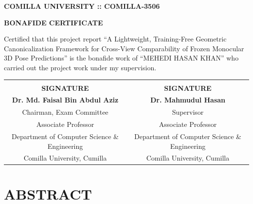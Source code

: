 \documentclass[12pt,a4paper]{report}
\begin{document}
\newpage
\thispagestyle{empty}
\begin{center}
{\fontsize{18}{22}\bfseries
COMILLA UNIVERSITY :: COMILLA-3506
}
\vspace{1cm}

{\fontsize{16}{19}\bfseries
BONAFIDE CERTIFICATE
}
\end{center}
\vspace{2cm}

\doublespacing
{\fontsize{14}{17}\selectfont
Certified that this project report ``A Lightweight, Training-Free Geometric Canonicalization Framework for Cross-View Comparability of Frozen Monocular 3D Pose Predictions'' is the bonafide work of ``MEHEDI HASAN KHAN'' who carried out the project work under my supervision.
}
\vspace{3cm}

\begin{center}
{\fontsize{11}{13}\selectfont
 \begin{tabular}{cc}
        \underline{\hspace{5.6cm}} & \underline{\hspace{5.6cm}} \\
        \textbf{SIGNATURE} & \textbf{SIGNATURE} \\
        \textbf{Dr. Md. Faisal Bin Abdul Aziz} & \textbf{Dr. Mahmudul Hasan} \\
        Chairman, Exam Committee & Supervisor \\
        Associate Professor & Associate Professor \\
        Department of Computer Science \& Engineering & Department of Computer Science \& Engineering \\
        Comilla University, Cumilla & Comilla University, Cumilla \\
    \end{tabular}}
\end{center}

\newpage
\setcounter{page}{3}
\chapter*{ABSTRACT}
\end{document}
